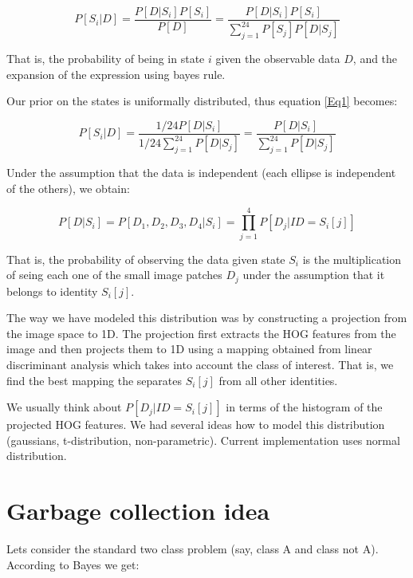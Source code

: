 \documentclass[12pt]{article}
\begin{document}
\begin{equation}
\label{Eq1}
P\left[ {{S_i}|D} \right] = \frac{{P\left[ {D|{S_i}} \right]P\left[ {{S_i}} \right]}}{{P\left[ D \right]}} = \frac{{P\left[ {D|{S_i}} \right]P\left[ {{S_i}} \right]}}{{\sum\limits_{j = 1}^{24} {P\left[ {{S_j}} \right]} P\left[ {D|{S_j}} \right]}}
\end{equation}

That is, the probability of being in state $i$ given the observable data $D$, and the expansion of the expression using bayes rule.

Our prior on the states is uniformally distributed, thus equation \ref{Eq1} becomes:

\begin{equation}
\label{Eq2}
P\left[ {{S_i}|D} \right] = \frac{{1/24P\left[ {D|{S_i}} \right]}}{{1/24\sum\limits_{j = 1}^{24} {P\left[ {D|{S_j}} \right]} }} = \frac{{P\left[ {D|{S_i}} \right]}}{{\sum\limits_{j = 1}^{24} {P\left[ {D|{S_j}} \right]} }}
\end{equation}

Under the assumption that the data is independent (each ellipse is independent of the others), we obtain:

\begin{equation}
\label{Eq2}
P\left[ {D|{S_i}} \right] = P\left[ {{D_1},{D_2},{D_3},{D_4}|{S_i}} \right] = \prod\limits_{j = 1}^4 {P\left[ {{D_j}|ID = {S_i}[j]} \right]}
\end{equation}

That is, the probability of observing the data given state $S_i$ is the multiplication of seing each one of the small image patches $D_j$ under the assumption that it belongs to identity ${S_i}\left[ j \right]$.

The way we have modeled this distribution was by constructing a projection from the image space to 1D. The projection first extracts the HOG features from the image and then projects them to 1D using a mapping obtained from linear discriminant analysis which takes into account the class of interest. That is, we find the best mapping the separates ${S_i}\left[ j \right]$ from all other identities.

We usually think about $P\left[ {{D_j}|ID = {S_i}[j]} \right]$ in terms of the histogram of the projected HOG features. We had several ideas how to model this distribution (gaussians, t-distribution, non-parametric). Current implementation uses normal distribution.


\section{Garbage collection idea}
Lets consider the standard two class problem (say, class A and class not A). According to Bayes we get:
\end{document}
